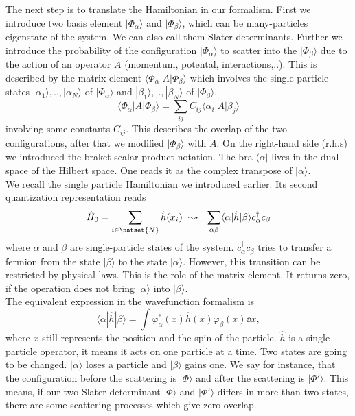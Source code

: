 \documentclass[../main.tex]{subfile}
\begin{document}
The next step is to translate the Hamiltonian in our formalism.
First we introduce two basis element $|\Phi_{\alpha}\rangle$ and $|\Phi_{\beta}\rangle$, which can be many-particles eigenstate of the system.
We can also call them Slater determinants.
Further we introduce the probability of the configuration $|\Phi_{\alpha}\rangle$ to scatter into the $|\Phi_{\beta}\rangle$ due to the action of an operator $A$ (momentum, potental, interactions,..).
This is described by the matrix element $\langle\Phi_{\alpha}|A|\Phi_{\beta}\rangle$ which involves the single particle states $|\alpha_1\rangle, .., |\alpha_N\rangle$ of $|\Phi_{\alpha}\rangle$
and $|\beta_1\rangle, ..,|\beta_N\rangle$ of $|\Phi_{\beta}\rangle$.
\[
    \langle\Phi_{\alpha}|A|\Phi_{\beta}\rangle = \sum_{ij} C_{ij}\langle\alpha_i|A|\beta_j\rangle
\]
involving some constants $C_{ij}$. This describes the overlap of the two configurations, after that we modified $|\Phi_{\beta}\rangle$ with $A$.
On the right-hand side (r.h.s) we introduced the braket scalar product notation. The bra $\langle\alpha|$ lives in the dual space
of the Hilbert space. One reads it as the complex transpose of $|\alpha\rangle$.\\

We recall the single particle Hamiltonian we introduced earlier. Its second quantization representation reads
\begin{equation}\label{eq:SecondquantizationSingleParticle}
    \hat{H}_0 = \sum_{i \in \natset{N}} \hat{h}(x_i) ~ \leadsto ~~ \sum_{\alpha\beta} \langle \alpha|\hat{h}|\beta\rangle c_{\alpha}^{\dagger}c_{\beta}
\end{equation}
where $\alpha$ and $\beta$ are single-particle states of the system. $c_{\alpha}^{\dagger}c_{\beta}$ tries to transfer a fermion
from the state $|\beta\rangle$ to the state $|\alpha\rangle$. However, this transition can be restricted by physical laws. This is the role of the matrix element.
It returns zero, if the operation does not bring $|\alpha\rangle$ into $|\beta\rangle$.\\

The equivalent expression in the wavefunction formalism is
\begin{equation}\label{eq:Translation_TwoStateOverlap}  
    \langle \alpha|\hat{h}|\beta\rangle = \int  \varphi_{\alpha}^{\ast}(x) \hat{h}(x) \varphi_{\beta}(x) \dd x,
\end{equation}
where $x$ still represents the position and the spin of the particle.
$\hat{h}$ is a single particle operator, it means it acts on one particle at a time.
Two states are going to be changed. $|\alpha\rangle$ loses a particle and $|\beta\rangle$ gains one. We say for instance, that the 
configuration before the scattering is $|\Phi\rangle$ and after the scattering is $|\Phi'\rangle$. 
This means, if our two Slater determinant $|\Phi\rangle$ and $|\Phi'\rangle$ differs in more than two states, there are some scattering processes which give zero overlap.\\
\end{document}
